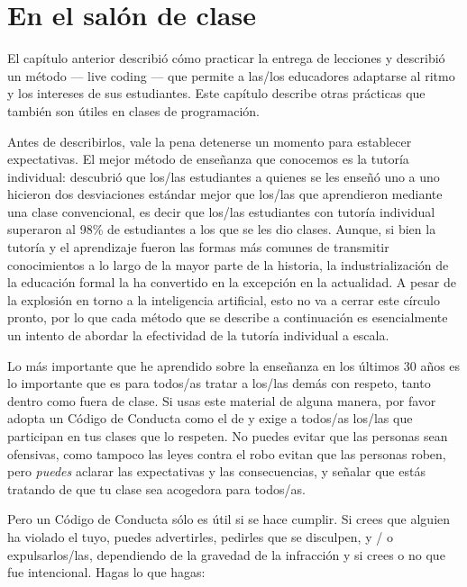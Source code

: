 \chapter{En el salón de clase}\label{s:classroom}

El capítulo anterior describió cómo practicar la entrega de lecciones
y describió un método --- live coding --- que
permite a las/los educadores adaptarse al ritmo y los intereses de sus estudiantes.
Este capítulo describe otras prácticas que también son útiles en clases de programación.

Antes de describirlos,
vale la pena detenerse un momento para establecer expectativas.
El mejor método de enseñanza que conocemos es la tutoría individual:
\cite{Bloo1984} descubrió que los/las estudiantes a quienes se les enseñó uno a uno
hicieron dos desviaciones estándar mejor que los/las que aprendieron mediante una clase convencional,
es decir que los/las estudiantes con tutoría individual superaron al
98\% de estudiantes a los que se les dio clases.
Aunque,
si bien la tutoría y el aprendizaje fueron las formas más comunes de transmitir conocimientos
a lo largo de la mayor parte de la historia,
la industrialización de la educación formal la ha convertido en la excepción en la actualidad.
A pesar de la explosión en torno a la inteligencia artificial,
esto no va a cerrar este círculo pronto,
por lo que cada método que se describe a continuación es esencialmente
un intento de abordar la efectividad de la tutoría individual a escala.


Lo más importante que he aprendido sobre la enseñanza en los últimos 30 años es
lo importante que es para todos/as tratar a los/las demás con respeto,
tanto dentro como fuera de clase.
Si usas este material de alguna manera,
por favor adopta un Código de Conducta como el de 
y exige a todos/as los/las que participan en tus clases que lo respeten.
No puedes evitar que las personas sean ofensivas,
como tampoco las leyes contra el robo evitan que las personas roben,
pero \emph{puedes} aclarar las expectativas y las consecuencias,
y señalar que estás tratando de que tu clase sea acogedora para todos/as.

Pero un Código de Conducta sólo es útil si se hace cumplir.
Si crees que alguien ha violado el tuyo,
puedes advertirles,
pedirles que se disculpen,
y / o expulsarlos/las,
dependiendo de la gravedad de la infracción y si crees o no que fue intencional.
Hagas lo que hagas:

